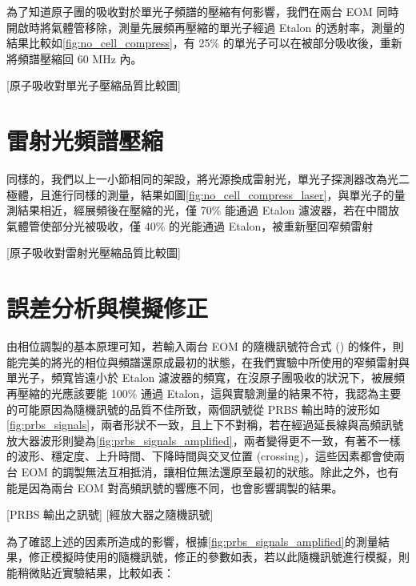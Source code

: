 \documentclass[class=NCU_thesis, crop=false]{standalone}
\begin{document}
為了知道原子團的吸收對於單光子頻譜的壓縮有何影響，我們在兩台 EOM 同時開啟時將氣體管移除，測量先展頻再壓縮的單光子經過 Etalon 的透射率，測量的結果比較如\cref{fig:no_cell_compress}，有 25\% 的單光子可以在被部分吸收後，重新將頻譜壓縮回 60 MHz 內。

[原子吸收對單光子壓縮品質比較圖]

\section{雷射光頻譜壓縮}

同樣的，我們以上一小節相同的架設，將光源換成雷射光，單光子探測器改為光二極體，且進行同樣的測量，結果如圖\cref{fig:no_cell_compress_laser}，與單光子的量測結果相近，經展頻後在壓縮的光，僅 70\% 能通過 Etalon 濾波器，若在中間放氣體管使部分光被吸收，僅 40\% 的光能通過 Etalon，被重新壓回窄頻雷射

[原子吸收對雷射光壓縮品質比較圖]

\section{誤差分析與模擬修正}

由相位調製的基本原理可知，若輸入兩台 EOM 的隨機訊號符合式 () 的條件，則能完美的將光的相位與頻譜還原成最初的狀態，在我們實驗中所使用的窄頻雷射與單光子，頻寬皆遠小於 Etalon 濾波器的頻寬，在沒原子團吸收的狀況下，被展頻再壓縮的光應該要能 100\% 通過 Etalon，這與實驗測量的結果不符，我認為主要的可能原因為隨機訊號的品質不佳所致，兩個訊號從 PRBS 輸出時的波形如\cref{fig:prbs_signals}，兩者形狀不一致，且上下不對稱，若在經過延長線與高頻訊號放大器波形則變為\cref{fig:prbs_signals_amplified}，兩者變得更不一致，有著不一樣的波形、穩定度、上升時間、下降時間與交叉位置 (crossing)，這些因素都會使兩台 EOM 的調製無法互相抵消，讓相位無法還原至最初的狀態。除此之外，也有能是因為兩台 EOM 對高頻訊號的響應不同，也會影響調製的結果。

[PRBS 輸出之訊號]
[經放大器之隨機訊號]

為了確認上述的因素所造成的影響，根據\cref{fig:prbs_signals_amplified}的測量結果，修正模擬時使用的隨機訊號，修正的參數如表，若以此隨機訊號進行模擬，則能稍微貼近實驗結果，比較如表：
\end{document}
